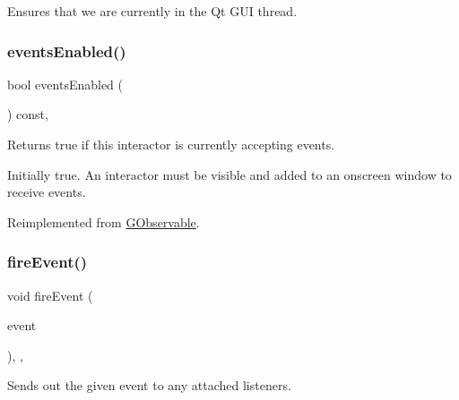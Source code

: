 Ensures that we are currently in the Qt G\+UI thread. 

\mbox{\label{classGInteractor_ac05ba5b92e2e5146d416fe7f842a0969}} 
\subsubsection{\texorpdfstring{events\+Enabled()}{eventsEnabled()}}
{\footnotesize\ttfamily bool events\+Enabled (\begin{DoxyParamCaption}{ }\end{DoxyParamCaption}) const\hspace{0.3cm}{\ttfamily [virtual]}, {\ttfamily [inherited]}}



Returns true if this interactor is currently accepting events. 

Initially true. An interactor must be visible and added to an onscreen window to receive events. 

Reimplemented from \mbox{\hyperlink{classGObservable_a8ebb3da91032e7f4c34485dabc518b8a}{G\+Observable}}.

\mbox{\label{classGObservable_a63e5e5a6227c59c928493b11aceb0f67}} 
\subsubsection{\texorpdfstring{fire\+Event()}{fireEvent()}}
{\footnotesize\ttfamily void fire\+Event (\begin{DoxyParamCaption}\item[{\mbox{\hyperlink{classGEvent}{G\+Event}} \&}]{event }\end{DoxyParamCaption})\hspace{0.3cm}{\ttfamily [protected]}, {\ttfamily [virtual]}, {\ttfamily [inherited]}}



Sends out the given event to any attached listeners. 

\mbox{\label{classGObservable_ab3983ea07337b52020a29cc00c653d8d}} 

